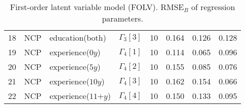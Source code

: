 \begin{table}[H]
\begin{tabular}{rlllrrrr}
		18 & NCP & \footnotesize{education(both)} & $\Gamma_{3}[3]$ &   10 & 0.164 & 0.126 & 0.128 \\ 
		19 & NCP & \footnotesize{experience($0y$)} & $\Gamma_{4}[1]$ &   10 & 0.114 & 0.065 & 0.096 \\ 
		20 & NCP & \footnotesize{experience($5y$)} & $\Gamma_{4}[2]$ &   10 & 0.155 & 0.085 & 0.076 \\ 
		21 & NCP & \footnotesize{experience($10y$)} & $\Gamma_{4}[3]$ &   10 & 0.162 & 0.154 & 0.066 \\ 
		22 & NCP & \footnotesize{experience($11\text{+}y$)} & $\Gamma_{4}[4]$ &   10 & 0.150 & 0.133 & 0.095 \\ 
		\hline
	\end{tabular}
	\caption[First-order latent variable model (FOLV). $\text{RMSE}_{B}$ of regression parameters.]%
	{First-order latent variable model (FOLV). $\text{RMSE}_{B}$ of regression parameters.} 
	\label{tab:FOLV_RMSE_regression}
\end{table}

